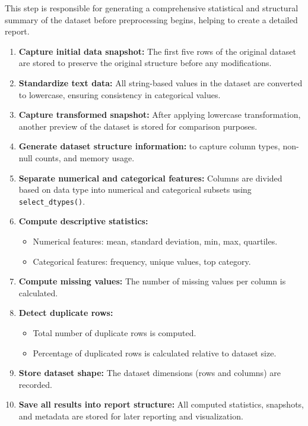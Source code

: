 This step is responsible for generating a comprehensive statistical and structural summary of the dataset before preprocessing begins, helping to create a detailed report.
\begin{enumerate}
    \item \textbf{Capture initial data snapshot:} The first five rows of the original dataset are stored to preserve the original structure before any modifications.

    \item \textbf{Standardize text data:} All string-based values in the dataset are converted to lowercase, ensuring consistency in categorical values.

    \item \textbf{Capture transformed snapshot:} After applying lowercase transformation, another preview of the dataset is stored for comparison purposes.

    \item \textbf{Generate dataset structure information:} to capture column types, non-null counts, and memory usage.

    \item \textbf{Separate numerical and categorical features:} Columns are divided based on data type into numerical and categorical subsets using \texttt{select\_dtypes()}.

    \item \textbf{Compute descriptive statistics:}
    \begin{itemize}
        \item Numerical features: mean, standard deviation, min, max, quartiles.
        \item Categorical features: frequency, unique values, top category.
    \end{itemize}

    \item \textbf{Compute missing values:} The number of missing values per column is calculated.

    \item \textbf{Detect duplicate rows:}
    \begin{itemize}
        \item Total number of duplicate rows is computed.
        \item Percentage of duplicated rows is calculated relative to dataset size.
    \end{itemize}

    \item \textbf{Store dataset shape:} The dataset dimensions (rows and columns) are recorded.

    \item \textbf{Save all results into report structure:} All computed statistics, snapshots, and metadata are stored for later reporting and visualization.
\end{enumerate}
